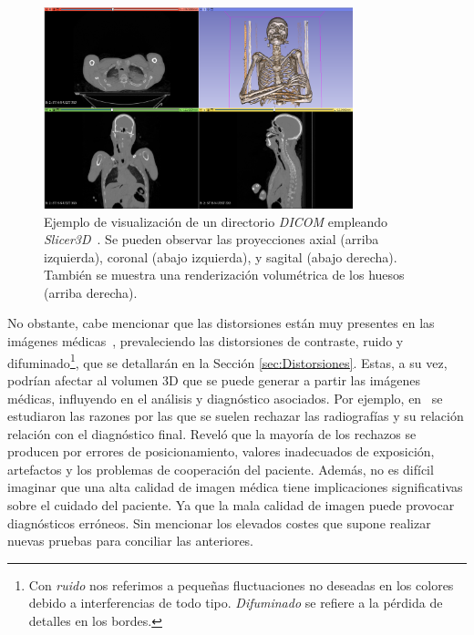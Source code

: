 \begin{figure}[htp]
  \begin{center}
    \includegraphics[width=0.8\textwidth]{imagenes/chapter1/SlicerVisualization}
  \end{center}
  \caption[Ejemplo de visualización de un directorio DICOM.]{Ejemplo de visualización de un directorio \emph{DICOM}
    empleando \emph{Slicer3D}~\cite{Slicer3D}. Se pueden observar
  las proyecciones axial (arriba izquierda), coronal (abajo izquierda),
  y sagital (abajo derecha). También se muestra una renderización volumétrica
de los huesos (arriba derecha).
} 
  \label{fig:SlicerVisualization}
\end{figure}

No obstante, cabe mencionar que las distorsiones
están muy presentes en las imágenes médicas~\cite{MedicalImpactOfDistortions}, 
prevaleciendo las distorsiones de contraste, ruido y difuminado\footnote{
  Con \emph{ruido} nos referimos a pequeñas fluctuaciones no deseadas en los colores
  debido a interferencias de todo tipo. \emph{Difuminado} se refiere a la 
  pérdida de detalles en los bordes.
}, 
que se detallarán en la Sección \ref{sec:Distorsiones}.
Estas, a su vez, podrían afectar al volumen 3D que se puede generar a partir 
las imágenes médicas, influyendo en el análisis y diagnóstico asociados. Por ejemplo, 
 en~\cite{XrayRejectionFactor} se estudiaron las razones por las que se suelen 
rechazar las radiografías y su relación relación con el diagnóstico final. 
Reveló que la mayoría de los rechazos se producen por 
errores de posicionamiento, valores inadecuados de exposición, artefactos 
y los problemas de cooperación del paciente. 
Además, no es difícil imaginar que una alta 
calidad de imagen médica tiene implicaciones significativas sobre el cuidado
del paciente. Ya que la mala calidad de imagen puede provocar diagnósticos erróneos. 
Sin mencionar los elevados costes que supone realizar 
nuevas pruebas para conciliar las anteriores. 

